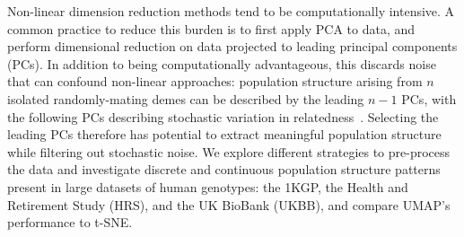 Non-linear dimension reduction methods tend to be computationally intensive. A common practice to reduce this burden is to first apply PCA to data, and perform dimensional reduction on data projected to leading principal components (PCs). In addition to being computationally advantageous, this discards noise that can confound non-linear approaches: population structure arising from $n$ isolated randomly-mating demes can be described by the leading $n-1$ PCs, with the following PCs describing stochastic variation in relatedness~\citep{eigen2006}. Selecting the leading PCs therefore has potential to extract meaningful population structure while filtering out stochastic noise. We explore different strategies to pre-process the data and investigate discrete and continuous population structure patterns present in large datasets of human genotypes: the 1KGP, the Health and Retirement Study (HRS)\citep{juster1995overview}, and the UK BioBank (UKBB)\citep{sudlow2015uk}, and compare UMAP's performance to t-SNE.  

\clearpage

